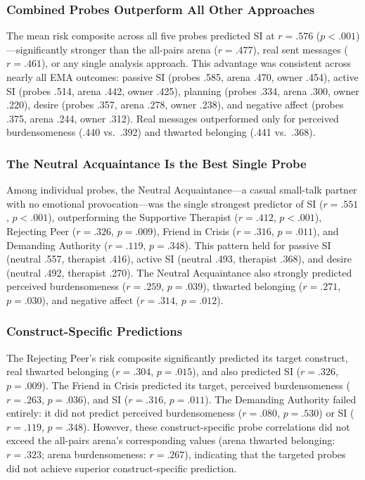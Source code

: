 \documentclass[review,12pt,authoryear]{elsarticle}
\begin{document}
\subsubsection{Combined Probes Outperform All Other Approaches}

The mean risk composite across all five probes predicted SI at $r = .576$ ($p < .001$)---significantly stronger than the all-pairs arena ($r = .477$), real sent messages ($r = .461$), or any single analysis approach. This advantage was consistent across nearly all EMA outcomes: passive SI (probes .585, arena .470, owner .454), active SI (probes .514, arena .442, owner .425), planning (probes .334, arena .300, owner .220), desire (probes .357, arena .278, owner .238), and negative affect (probes .375, arena .244, owner .312). Real messages outperformed only for perceived burdensomeness (.440 vs.\ .392) and thwarted belonging (.441 vs.\ .368).

\subsubsection{The Neutral Acquaintance Is the Best Single Probe}

Among individual probes, the Neutral Acquaintance---a casual small-talk partner with no emotional provocation---was the single strongest predictor of SI ($r = .551$, $p < .001$), outperforming the Supportive Therapist ($r = .412$, $p < .001$), Rejecting Peer ($r = .326$, $p = .009$), Friend in Crisis ($r = .316$, $p = .011$), and Demanding Authority ($r = .119$, $p = .348$). This pattern held for passive SI (neutral .557, therapist .416), active SI (neutral .493, therapist .368), and desire (neutral .492, therapist .270). The Neutral Acquaintance also strongly predicted perceived burdensomeness ($r = .259$, $p = .039$), thwarted belonging ($r = .271$, $p = .030$), and negative affect ($r = .314$, $p = .012$).

\subsubsection{Construct-Specific Predictions}

The Rejecting Peer's risk composite significantly predicted its target construct, real thwarted belonging ($r = .304$, $p = .015$), and also predicted SI ($r = .326$, $p = .009$). The Friend in Crisis predicted its target, perceived burdensomeness ($r = .263$, $p = .036$), and SI ($r = .316$, $p = .011$). The Demanding Authority failed entirely: it did not predict perceived burdensomeness ($r = .080$, $p = .530$) or SI ($r = .119$, $p = .348$). However, these construct-specific probe correlations did not exceed the all-pairs arena's corresponding values (arena thwarted belonging: $r = .323$; arena burdensomeness: $r = .267$), indicating that the targeted probes did not achieve superior construct-specific prediction.
\end{document}
